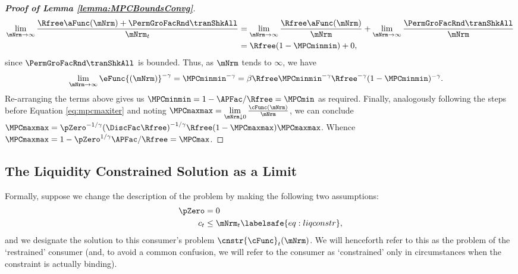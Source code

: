 \documentclass[\econtexRoot/BufferStockTheory]{subfiles}
\begin{document}
\begin{proof}[\textbf{Proof of Lemma \ref{lemma:MPCBoundsConvg}}]
\begin{equation}\begin{gathered}\begin{aligned}
\lim_{\mNrm\rightarrow \infty}\frac{\Rfree \aFunc(\mNrm)+{\PermGroFacRnd}{\tranShkAll}}{\mNrm_{t}} &  = \lim_{\mNrm \rightarrow \infty}\frac{\Rfree \aFunc(\mNrm)}{\mNrm} + \lim_{\mNrm\rightarrow \infty}\frac{{\PermGroFacRnd}{\tranShkAll}}{\mNrm} \\
			& = \Rfree (1- \MPCminmin) + 0, 
\end{aligned}\end{gathered}\end{equation}
since ${\PermGroFacRnd}{\tranShkAll}$ is bounded.
Thus, as $\mNrm$ tends to $\infty$, we have
%
\begin{equation}\begin{gathered}\begin{aligned} %
 \lim\limits_{\mNrm\rightarrow \infty}\eFunc{(\mNrm)}^{-\CRRA}  & =  \MPCminmin^{-\CRRA} = \beta\Rfree\MPCminmin^{-\CRRA}\Rfree^{-\CRRA} (1- \MPCminmin) ^{-\CRRA}. 
\end{aligned}\end{gathered}\end{equation}
%
Re-arranging the terms above gives us $\MPCminmin =1-  \APFac/\Rfree =  \MPCmin$ as required.
Finally, analogously following the steps before Equation \eqref{eq:mpcmaxiter} and noting $\MPCmaxmax = \lim\limits_{\mNrm\downarrow 0}\frac{\cFunc(\mNrm)}{\mNrm}$, we can conclude $\MPCmaxmax  = \pZero^{-1/\CRRA} {(\DiscFac
\Rfree)}^{-1/\CRRA}\Rfree(1-\MPCmaxmax)\MPCmaxmax$.
Whence $\MPCmaxmax = 1- \pZero^{1/\CRRA}\APFac/\Rfree = \MPCmax$.




%
\end{proof}

\subsection{The Liquidity Constrained Solution as a Limit}\label{sec:LiqConstrAsLimit}

Formally, suppose we change the description of the problem by making
the following two assumptions:
\begin{eqnarray*}
  \pZero   & = 0
  \\  c_{t} & \leq  \mNrm_{t} \labelsafe{eq:liqconstr},
\end{eqnarray*}
and we designate the solution to this consumer's problem $\cnstr{\cFunc}_{t}(\mNrm)$.
We will henceforth refer to this as the problem of the `restrained' consumer (and, to avoid a common confusion, we will refer to the consumer as `constrained' only in circumstances when the constraint is actually binding).
\end{document}
